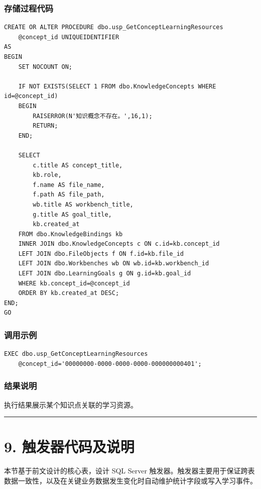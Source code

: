 \documentclass[10pt,a4paper,fontset=none]{ctexart}
\begin{document}
\subsubsection*{存储过程代码}

\begin{Verbatim}[fontsize=\scriptsize,frame=single]
CREATE OR ALTER PROCEDURE dbo.usp_GetConceptLearningResources
    @concept_id UNIQUEIDENTIFIER
AS
BEGIN
    SET NOCOUNT ON;

    IF NOT EXISTS(SELECT 1 FROM dbo.KnowledgeConcepts WHERE id=@concept_id)
    BEGIN
        RAISERROR(N'知识概念不存在。',16,1);
        RETURN;
    END;

    SELECT
        c.title AS concept_title,
        kb.role,
        f.name AS file_name,
        f.path AS file_path,
        wb.title AS workbench_title,
        g.title AS goal_title,
        kb.created_at
    FROM dbo.KnowledgeBindings kb
    INNER JOIN dbo.KnowledgeConcepts c ON c.id=kb.concept_id
    LEFT JOIN dbo.FileObjects f ON f.id=kb.file_id
    LEFT JOIN dbo.Workbenches wb ON wb.id=kb.workbench_id
    LEFT JOIN dbo.LearningGoals g ON g.id=kb.goal_id
    WHERE kb.concept_id=@concept_id
    ORDER BY kb.created_at DESC;
END;
GO
\end{Verbatim}

\subsubsection*{调用示例}

\begin{Verbatim}[fontsize=\scriptsize,frame=single]
EXEC dbo.usp_GetConceptLearningResources
    @concept_id='00000000-0000-0000-0000-000000000401';
\end{Verbatim}

\subsubsection*{结果说明}

执行结果展示某个知识点关联的学习资源。\par

\bigskip\hrule\bigskip
\clearpage
\section*{9. 触发器代码及说明}

本节基于前文设计的核心表，设计 SQL Server 触发器。触发器主要用于保证跨表数据一致性，以及在关键业务数据发生变化时自动维护统计字段或写入学习事件。\par
\end{document}
